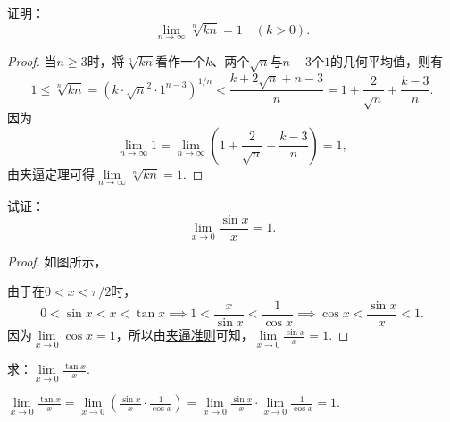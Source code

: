 \begin{example}
证明：\begin{equation}
	\lim\limits_{n\to\infty} \sqrt[n]{k n} = 1
	\quad(k>0).
\end{equation}
\begin{proof}
当\(n \geqslant 3\)时，将\(\sqrt[n]{k n}\)看作一个\(k\)、两个\(\sqrt{n}\)与\(n-3\)个\(1\)的几何平均值，则有\[
1 \leqslant \sqrt[n]{k n} = (k \cdot \sqrt{n}^2 \cdot 1^{n-3})^{1/n}
< \frac{k + 2\sqrt{n} + n-3}{n}
= 1 + \frac{2}{\sqrt{n}} + \frac{k-3}{n}.
\]因为\[
\lim\limits_{n\to\infty} 1
= \lim\limits_{n\to\infty} \left(1 + \frac{2}{\sqrt{n}} + \frac{k-3}{n}\right) = 1,
\]由夹逼定理可得\(\lim\limits_{n\to\infty} \sqrt[n]{k n} = 1\).
\end{proof}
\end{example}

\begin{example}[重要极限I]
试证：\begin{equation}\label{equation:极限.重要极限I}
\lim\limits_{x\to0} \frac{\sin x}{x} = 1.
\end{equation}
\begin{proof}
如图所示，%
\begin{center}
\end{center}
由于在\(0 < x < \pi/2\)时，\[
0 < \sin x < x < \tan x
\implies
1 < \frac{x}{\sin x} < \frac{1}{\cos x}
\implies
\cos x < \frac{\sin x}{x} < 1.
\]
因为\(\lim\limits_{x\to0}\cos x = 1\)，所以由\hyperref[theorem:极限.夹逼准则]{夹逼准则}可知，\(\lim\limits_{x\to0} \frac{\sin x}{x} = 1\).
\end{proof}
\end{example}

\begin{example}
\def\l{\lim\limits_{x\to0}}
求：\(\l \frac{\tan x}{x}\).
\begin{solution}
\(
\l \frac{\tan x}{x}
= \l \left(\frac{\sin x}{x} \cdot \frac{1}{\cos x}\right)
= \l \frac{\sin x}{x} \cdot \lim\limits_{x\to0}\frac{1}{\cos x}
= 1.
\)
\end{solution}
\end{example}

